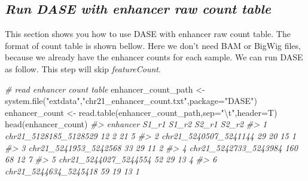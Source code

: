 \documentclass[
]{article}
\newenvironment{Shaded}{\begin{snugshade}}{\end{snugshade}}
\newcommand{\AttributeTok}[1]{\textcolor[rgb]{0.77,0.63,0.00}{#1}}
\newcommand{\CommentTok}[1]{\textcolor[rgb]{0.56,0.35,0.01}{\textit{#1}}}
\newcommand{\FunctionTok}[1]{\textcolor[rgb]{0.00,0.00,0.00}{#1}}
\newcommand{\NormalTok}[1]{#1}
\newcommand{\OtherTok}[1]{\textcolor[rgb]{0.56,0.35,0.01}{#1}}
\newcommand{\SpecialCharTok}[1]{\textcolor[rgb]{0.00,0.00,0.00}{#1}}
\newcommand{\StringTok}[1]{\textcolor[rgb]{0.31,0.60,0.02}{#1}}
\begin{document}
\hypertarget{run-dase-with-enhancer-raw-count-table}{%
\subsection{\texorpdfstring{\emph{Run DASE with enhancer raw count
table}}{Run DASE with enhancer raw count table}}\label{run-dase-with-enhancer-raw-count-table}}

This section shows you how to use DASE with enhancer raw count table.
The format of count table is shown bellow. Here we don't need BAM or
BigWig files, because we already have the enhancer counts for each
sample. We can run DASE as follow. This step will skip
\emph{featureCount}.

\begin{Shaded}
\begin{Highlighting}[]
\CommentTok{\# read enhancer count table}
\NormalTok{enhancer\_count\_path }\OtherTok{\textless{}{-}} \FunctionTok{system.file}\NormalTok{(}\StringTok{"extdata"}\NormalTok{,}\StringTok{"chr21\_enhancer\_count.txt"}\NormalTok{,}\AttributeTok{package=}\StringTok{"DASE"}\NormalTok{)}
\NormalTok{enhancer\_count }\OtherTok{\textless{}{-}} \FunctionTok{read.table}\NormalTok{(enhancer\_count\_path,}\AttributeTok{sep=}\StringTok{"}\SpecialCharTok{\textbackslash{}t}\StringTok{"}\NormalTok{,}\AttributeTok{header=}\NormalTok{T)}
\FunctionTok{head}\NormalTok{(enhancer\_count)}
\CommentTok{\#\textgreater{}                enhancer S1\_r1 S1\_r2 S2\_r1 S2\_r2}
\CommentTok{\#\textgreater{} 1 chr21\_5128185\_5128529    12     2    21     5}
\CommentTok{\#\textgreater{} 2 chr21\_5240507\_5241144    29    20    15     1}
\CommentTok{\#\textgreater{} 3 chr21\_5241953\_5242568    33    29    11     2}
\CommentTok{\#\textgreater{} 4 chr21\_5242733\_5243984   160    68    12     7}
\CommentTok{\#\textgreater{} 5 chr21\_5244027\_5244554    52    29    13     4}
\CommentTok{\#\textgreater{} 6 chr21\_5244634\_5245418    59    19    13     1}


\end{Highlighting}
\end{Shaded}
\end{document}

